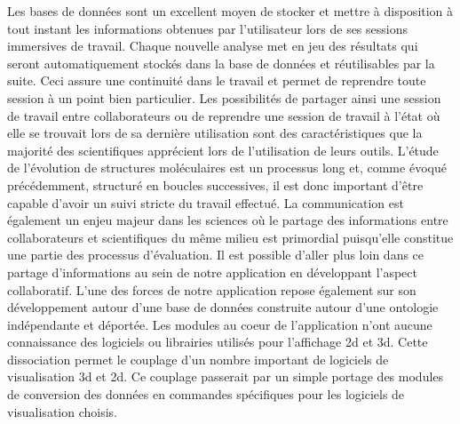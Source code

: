 Les bases de données sont un excellent moyen de stocker et mettre à disposition à tout instant les informations obtenues par l'utilisateur lors de ses sessions immersives de travail. Chaque nouvelle analyse met en jeu des résultats qui seront automatiquement stockés dans la base de données et réutilisables par la suite. Ceci assure une continuité dans le travail et permet de reprendre toute session à un point bien particulier. Les possibilités de partager ainsi une session de travail entre collaborateurs ou de reprendre une session de travail à l'état où elle se trouvait lors de sa dernière utilisation sont des caractéristiques que la majorité des scientifiques apprécient lors de l'utilisation de leurs outils. L'étude de l'évolution de structures moléculaires est un processus long et, comme évoqué précédemment, structuré en boucles successives, il est donc important d'être capable d'avoir un suivi stricte du travail effectué. La communication est également un enjeu majeur dans les sciences où le partage des informations entre collaborateurs et scientifiques du même milieu est primordial puisqu'elle constitue une partie des processus d'évaluation. Il est possible d'aller plus loin dans ce partage d'informations au sein de notre application en développant l'aspect collaboratif. L'une des forces de notre application repose également sur son développement autour d'une base de données construite autour d'une ontologie indépendante et déportée. Les modules au coeur de l'application n'ont aucune connaissance des logiciels ou librairies utilisés pour l'affichage 2d et 3d. Cette dissociation permet le couplage d'un nombre important de logiciels de visualisation 3d et 2d. Ce couplage passerait par un simple portage des modules de conversion des données en commandes spécifiques pour les logiciels de visualisation choisis.


